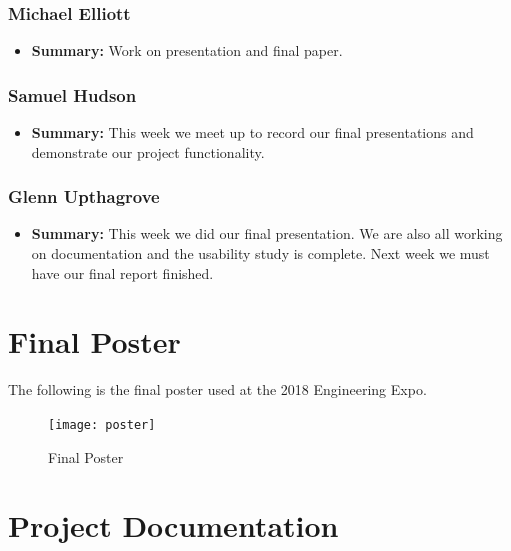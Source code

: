 \documentclass[onecolumn, draftclsnofoot,10pt, compsoc]{IEEEtran}
\begin{document}
\subsubsection{Michael Elliott}
\begin{itemize}
 \item \textbf{Summary: } Work on presentation and final paper.
\end{itemize}
\subsubsection{Samuel Hudson}
\begin{itemize}
 \item \textbf{Summary: } This week we meet up to record our final presentations and demonstrate our project functionality.
\end{itemize}
\subsubsection{Glenn Upthagrove}
\begin{itemize}
 \item \textbf{Summary: } This week we did our final presentation. We are also all working on documentation and the usability study is complete. Next week we must have our final report finished. 
\end{itemize}
\newpage
\section{Final Poster}
The following is the final poster used at the 2018 Engineering Expo.
\begin{figure}[h]
    \centering
        \texttt{[image: poster]}
        \caption{Final Poster}
        \label{fig:poster}
\end{figure}
\newpage

\section{Project Documentation}
\end{document}
